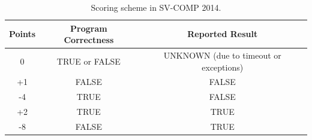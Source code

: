 



\begin{table}
\caption{Scoring scheme in SV-COMP 2014.\label{table:scoring-scheme-14}}
\begin{center}
\begin{tabular}{|c|c|c|}
\hline
Points & Program Correctness & Reported Result \\\hline
0      & TRUE or FALSE & UNKNOWN (due to timeout or exceptions) \\
+1     & FALSE         & FALSE \\
-4     & TRUE          & FALSE \\
+2     & TRUE          & TRUE \\
-8     & FALSE         & TRUE \\\hline
\end{tabular}
\end{center}
\end{table}


